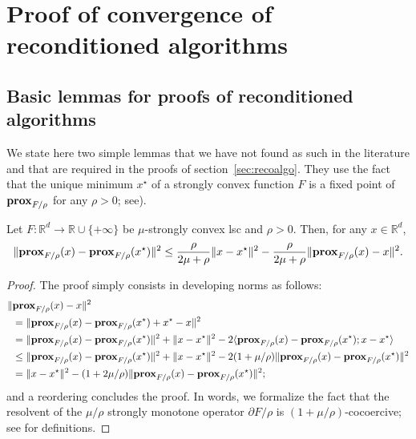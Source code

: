 \section{Proof of convergence of reconditioned algorithms} \label{apx:reco}


\subsection{Basic lemmas for proofs of reconditioned algorithms}


We state here two simple lemmas that we have not found as such in the literature and that are required in the proofs of section~\ref{sec:recoalgo}. They use the fact that the unique minimum $x^\star$ of a strongly convex function $F$ is a fixed point of $\mathbf{prox}_{F/{\rho }}$ for any $\rho>0$; see\;\cite[Prop.~12.28]{bauschke2011convex}).

\begin{lemma}
    \label{lem:opstrong}
    Let $F: \mathbb{R}^d \to \mathbb{R}\cup\{+\infty\}$ be $\mu$-strongly convex lsc and $\rho>0$.
    Then, %
    for any $x\in\mathbb{R}^d$,
    \begin{align*}
        \| \mathbf{prox}_{F/{\rho}}(x) - \mathbf{prox}_{F/{\rho}}(x^\star) \|^2 \leq \frac{{\rho}}{2\mu + {\rho}} \| x - x^\star \|^2 - \frac{{\rho}}{2\mu + {\rho}} \| \mathbf{prox}_{F/{\rho}}(x) - x \|^2.
    \end{align*}
\end{lemma}
\begin{proof}
    The proof simply consists in developing norms as follows:
    \begin{align*}
        \| &\mathbf{prox}_{F/{\rho}}(x) - x \|^2 \\
        &= \| \mathbf{prox}_{F/{\rho}}(x) - \mathbf{prox}_{F/{\rho}}(x^\star) + x^\star - x \|^2 \\
        &= \| \mathbf{prox}_{F/{\rho}}(x) - \mathbf{prox}_{F/{\rho}}(x^\star) \|^2 + \| x-  x^\star  \|^2 - 2 \langle   \mathbf{prox}_{F/{\rho}}(x) - \mathbf{prox}_{F/{\rho}}(x^\star) ; x-  x^\star \rangle  \\
        &\leq  \| \mathbf{prox}_{F/{\rho}}(x) - \mathbf{prox}_{F/{\rho}}(x^\star) \|^2 + \| x-  x^\star  \|^2 - 2(1+\mu/{\rho}) \| \mathbf{prox}_{F/{\rho}}(x) - \mathbf{prox}_{F/{\rho}}(x^\star) \|^2 \\
        &=  \| x-  x^\star  \|^2 - ( 1 + 2\mu/{\rho}) \| \mathbf{prox}_{F/{\rho}}(x) - \mathbf{prox}_{F/{\rho}}(x^\star) \|^2;
    \end{align*}
    and a reordering concludes the proof. In words, we formalize the fact that the resolvent of the $\mu/{\rho}$ strongly monotone operator $\partial F/{\rho}$ is $(1+\mu/{\rho})$-cocoercive; see\;\cite{bauschke2011convex} for definitions.
\end{proof}

